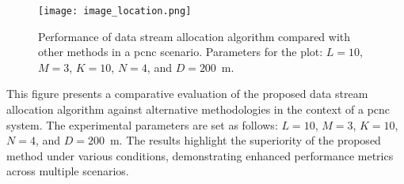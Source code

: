 \begin{figure}[tbp]
\centerline{\texttt{[image: image\_location.png]}}
\caption{Performance of data stream allocation algorithm compared with other methods in a \gls{pcnc} scenario. Parameters for the plot: $L=10$, $M=3$, $K=10$, $N=4$, and $D=200$~m.}
\label{fig:performance_plot}
\end{figure}


\noindent
This figure presents a comparative evaluation of the proposed data stream allocation algorithm against alternative methodologies in the context of a \gls{pcnc} system. The experimental parameters are set as follows: $L=10$, $M=3$, $K=10$, $N=4$, and $D=200$~m. The results highlight the superiority of the proposed method under various conditions, demonstrating enhanced performance metrics across multiple scenarios.

